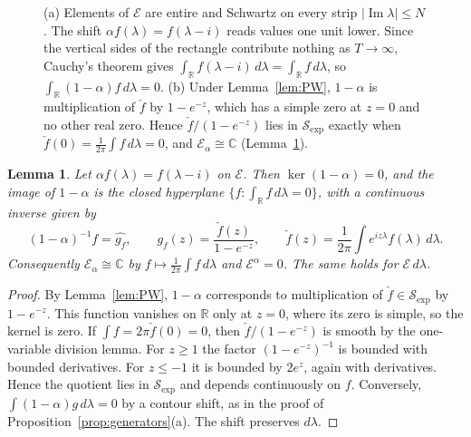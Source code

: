 \documentclass[11pt,oneside,reqno]{article}
\newcommand{\C}{\mathbb C}
\newcommand{\cE}{\mathcal E}
\newcommand{\Sexp}{\mathcal S_{\exp}}
\theoremstyle{plain}
\newtheorem{lemma}[theorem]{Lemma}
\theoremstyle{definition}
\theoremstyle{remark}
\begin{document}
\begin{figure}[tbp]
\caption[The strip algebra and the coinvariants of the shift]{(a)
Elements of \(\cE\) are entire and Schwartz on every strip
\(|\operatorname{Im}\lambda|\leq N\). The shift \(\alpha f(\lambda)=
f(\lambda-i)\) reads values one unit lower. Since the vertical sides of
the rectangle contribute nothing as \(T\to\infty\), Cauchy's theorem gives
\(\int_{\mathbb R}f(\lambda-i)\,d\lambda=\int_{\mathbb R}f\,d\lambda\), so
\(\int_{\mathbb R}(1-\alpha)f\,d\lambda=0\). (b) Under
Lemma~\ref{lem:PW}, \(1-\alpha\) is multiplication of \(\check f\) by
\(1-e^{-z}\), which has a simple zero at \(z=0\) and no other real zero.
Hence \(\check f/(1-e^{-z})\) lies in \(\Sexp\) exactly when
\(\check f(0)=\frac1{2\pi}\int f\,d\lambda=0\), and
\(\cE_\alpha\cong\C\) (Lemma~\ref{lem:coinv}).}
\label{fig:Eplane}
\end{figure}

\begin{lemma}\label{lem:coinv}
Let \(\alpha f(\lambda)=f(\lambda-i)\) on \(\cE\). Then
\(\ker(1-\alpha)=0\), and the image of \(1-\alpha\) is the closed
hyperplane \(\{f:\int_{\mathbb R}f\,d\lambda=0\}\), with a continuous
inverse given by
\[
 (1-\alpha)^{-1}f=\widehat{g_f},\qquad
 g_f(z)=\frac{\check f(z)}{1-e^{-z}},\qquad
 \check f(z)=\frac1{2\pi}\int e^{iz\lambda}f(\lambda)\,d\lambda .
\]
Consequently \(\cE_\alpha\cong\C\) by \(f\mapsto\frac1{2\pi}\int f\,
d\lambda\) and \(\cE^\alpha=0\). The same holds for \(\cE\,d\lambda\).
\end{lemma}

\begin{proof}
By Lemma~\ref{lem:PW}, \(1-\alpha\) corresponds to multiplication of
\(\check f\in\Sexp\) by \(1-e^{-z}\). This function vanishes on
\(\mathbb R\) only at \(z=0\), where its zero is simple, so the kernel is
zero. If \(\int f=2\pi\check f(0)=0\), then \(\check f/(1-e^{-z})\) is
smooth by the one-variable division lemma. For \(z\geq1\) the factor
\((1-e^{-z})^{-1}\) is bounded with bounded derivatives. For \(z\leq-1\) it
is bounded by \(2e^{z}\), again with derivatives. Hence the quotient lies
in \(\Sexp\) and depends continuously on \(f\). Conversely,
\(\int(1-\alpha)g\,d\lambda=0\) by a contour shift, as in the proof of
Proposition~\ref{prop:generators}(a). The shift preserves \(d\lambda\).
\end{proof}
\end{document}
